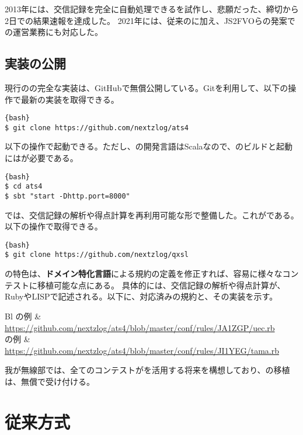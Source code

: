 \documentclass[10pt,a4paper]{book}
\begin{document}
2013年には、交信記録を完全に自動処理できるを試作し、悲願だった、締切から2日での結果速報を達成した。
2021年には、従来の\ja{}に加え、JS2FVOらの発案で\rt{}の運営業務にも対応した。

\section{実装の公開}

現行のの完全な実装は、GitHubで無償公開している。Gitを利用して、以下の操作で最新の実装を取得できる。

\begin{Verbatim}{bash}
$ git clone https://github.com/nextzlog/ats4
\end{Verbatim}

以下の操作で起動できる。ただし、の開発言語はScalaなので、のビルドと起動には\sbt{}が必要である。

\begin{Verbatim}{bash}
$ cd ats4
$ sbt "start -Dhttp.port=8000"
\end{Verbatim}

では、交信記録の解析や得点計算を再利用可能な形で整備した。これが\qxsl{}である。以下の操作で取得できる。

\begin{Verbatim}{bash}
$ git clone https://github.com/nextzlog/qxsl
\end{Verbatim}

の特色は、\textbf{ドメイン特化言語}による規約の定義を修正すれば、容易に様々なコンテストに移植可能な点にある。
具体的には、交信記録の解析や得点計算が、RubyやLISPで記述される。以下に、対応済みの規約と、その実装を示す。

\begin{table}[H]
\raggedright
\begin{tabular}{Bl}
\ue{}の例 & \url{https://github.com/nextzlog/ats4/blob/master/conf/rules/JA1ZGP/uec.rb} \\
\ta{}の例 & \url{https://github.com/nextzlog/ats4/blob/master/conf/rules/JI1YEG/tama.rb} \\
\end{tabular}
\end{table}

我が無線部では、全てのコンテストがを活用する将来を構想しており、の移植は、無償で受け付ける。

\chapter{従来方式\label{chap:mail}}
\end{document}
